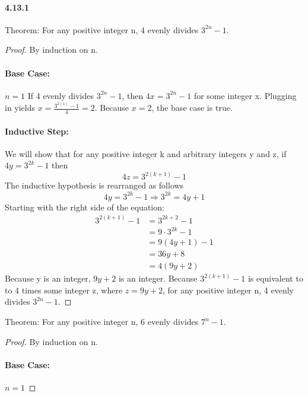 \documentclass[11pt, letterpaper, twocolumn, fleqn]{article}
\begin{document}
    \paragraph{4.13.1}
        \begin{enumerate}
          \item Theorem: For any positive integer n, 4 evenly divides $3^{2n}-1$.
          \begin{proof} By induction on n.
            \item \paragraph{Base Case:} $n=1$
            If 4 evenly divides $3^{2n}-1$, then $4x = 3^{2n}-1$ for some integer x. Plugging in yields $x = \frac{3^{2(1)}-1}{4} = 2$.  Because $x = 2$, the base case is true.
            \item \paragraph{Inductive Step:} We will show that for any positive integer k and arbitrary integers y and z, if $4y = 3^{2k}-1$ then 
              $$4z = 3^{2(k+1)}-1$$
            The inductive hypothesis is rearranged as follows 
              $$4y = 3^{2k}-1  \Rightarrow 3^{2k} = 4y+1$$
            Starting with the right side of the equation:
            \begin{align*}
              3^{2(k+1)}-1 &= 3^{2k+2}-1 \\
              &= 9\cdot3^{2k} - 1 \\
              &= 9(4y+1) - 1 \tag{inductive hypothesis} \\
              &= 36y+8 \\
              &= 4(9y+2)
            \end{align*}
            Because y is an integer, $9y+2$ is an integer. Because $3^{2(k+1)}-1$ is equivalent to to 4 times some integer z, where $z=9y+2$, for any positive integer n, 4 evenly divides $3^{2n}-1$.
          \end{proof}
          \item Theorem: For any positive integer n, 6 evenly divides $7^{n}-1$.
          \begin{proof} By induction on n.
            \item \paragraph{Base Case:} $n=1$

\end{proof}
\end{enumerate}
\end{document}
